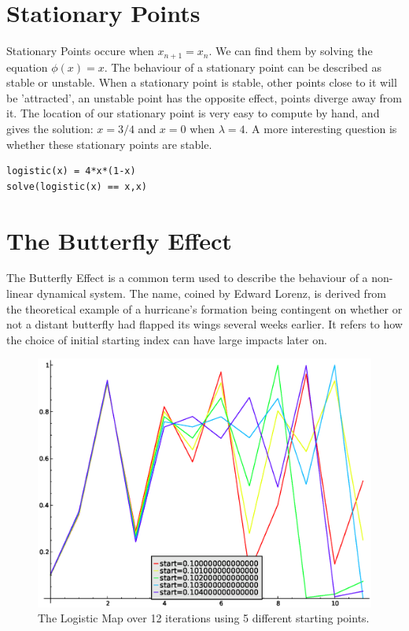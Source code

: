 \documentclass[a4paper]{article}
\begin{document}
\section{Stationary Points}
Stationary Points occure when $x_{n+1}=x_n$. We can find them by solving the equation $\phi(x)=x$. The behaviour of a stationary point can be described as stable or unstable. When a stationary point is stable, other points close to it will be 'attracted', an unstable point has the opposite effect, points diverge away from it. The location of our stationary point is very easy to compute by hand, and gives the solution: $x=3/4$ and $x=0$ when $\lambda =4$. A more interesting question is whether these stationary points are stable.

\begin{verbatim}
logistic(x) = 4*x*(1-x)
solve(logistic(x) == x,x)
\end{verbatim}


\section{The Butterfly Effect}
The Butterfly Effect is a common term used to describe the behaviour of a non-linear dynamical system. The name, coined by Edward Lorenz, is derived from the theoretical example of a hurricane's formation being contingent on whether or not a distant butterfly had flapped its wings several weeks earlier. \cite{wiki:ButterflyEffect} It refers to how the choice of initial starting index can have large impacts later on.
\begin{figure}[htdp]
\begin{center}
\includegraphics[scale=0.5]{images/butterflyeffect}
\end{center}
\caption{The Logistic Map over 12 iterations using 5 different starting points.}
\label{butterflyeffect}
\end{figure}



\end{document}
